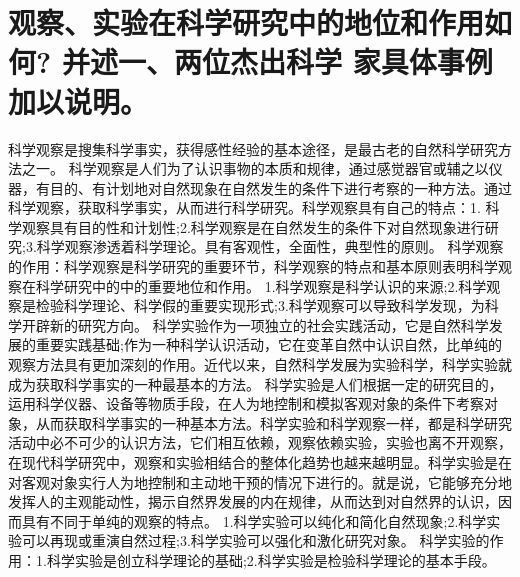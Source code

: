 \documentclass[a4paper]{article}
\begin{document}
\section{观察、实验在科学研究中的地位和作用如何? 并述一、两位杰出科学 家具体事例加以说明。}

科学观察是搜集科学事实，获得感性经验的基本途径，是最古老的自然科学研究方法之一。
科学观察是人们为了认识事物的本质和规律，通过感觉器官或辅之以仪器，有目的、有计划地对自然现象在自然发生的条件下进行考察的一种方法。通过科学观察，获取科学事实，从而进行科学研究。科学观察具有自己的特点：1. 科学观察具有目的性和计划性;2.科学观察是在自然发生的条件下对自然现象进行研究;3.科学观察渗透着科学理论。具有客观性，全面性，典型性的原则。
科学观察的作用：科学观察是科学研究的重要环节，科学观察的特点和基本原则表明科学观察在科学研究中的中的重要地位和作用。
1.科学观察是科学认识的来源;2.科学观察是检验科学理论、科学假的重要实现形式;3.科学观察可以导致科学发现，为科学开辟新的研究方向。
科学实验作为一项独立的社会实践活动，它是自然科学发展的重要实践基础;作为一种科学认识活动，它在变革自然中认识自然，比单纯的观察方法具有更加深刻的作用。近代以来，自然科学发展为实验科学，科学实验就成为获取科学事实的一种最基本的方法。
科学实验是人们根据一定的研究目的，运用科学仪器、设备等物质手段，在人为地控制和模拟客观对象的条件下考察对象，从而获取科学事实的一种基本方法。科学实验和科学观察一样，都是科学研究活动中必不可少的认识方法，它们相互依赖，观察依赖实验，实验也离不开观察，在现代科学研究中，观察和实验相结合的整体化趋势也越来越明显。科学实验是在对客观对象实行人为地控制和主动地干预的情况下进行的。就是说，它能够充分地发挥人的主观能动性，揭示自然界发展的内在规律，从而达到对自然界的认识，因而具有不同于单纯的观察的特点。
1.科学实验可以纯化和简化自然现象;2.科学实验可以再现或重演自然过程;3.科学实验可以强化和激化研究对象。
科学实验的作用：1.科学实验是创立科学理论的基础;2.科学实验是检验科学理论的基本手段。
\end{document}
